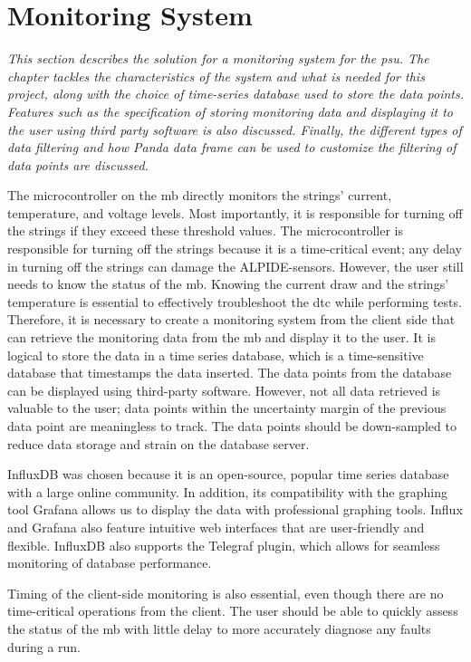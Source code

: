 \documentclass[main.tex]{subfiles}
\begin{document}
\section{Monitoring System}
\label{section: monitoring}
\textit{This section describes the solution for a monitoring system for the \gls{psu}. The chapter tackles the characteristics of the system and what is needed for this project, along with the choice of time-series database used to store the data points. Features such as the specification of storing monitoring data and displaying it to the user using third party software is also discussed. Finally, the different types of data filtering and how Panda data frame can be used to customize the filtering of data points are discussed.}


The microcontroller on the \gls{mb} directly monitors the strings' current, temperature, and voltage levels. Most importantly, it is responsible for turning off the strings if they exceed these threshold values. The microcontroller is responsible for turning off the strings because it is a time-critical event; any delay in turning off the strings can damage the ALPIDE-sensors. However, the user still needs to know the status of the \gls{mb}. Knowing the current draw and the strings' temperature is essential to effectively troubleshoot the \gls{dtc} while performing tests. Therefore, it is necessary to create a monitoring system from the client side that can retrieve the monitoring data from the \gls{mb} and display it to the user. It is logical to store the data in a time series database, which is a time-sensitive database that timestamps the data inserted. The data points from the database can be displayed using third-party software. However, not all data retrieved is valuable to the user; data points within the uncertainty margin of the previous data point are meaningless to track. The data points should be down-sampled to reduce data storage and strain on the database server.
 
InfluxDB was chosen because it is an open-source, popular time series database with a large online community. In addition, its compatibility with the graphing tool Grafana allows us to display the data with professional graphing tools. Influx and Grafana also feature intuitive web interfaces that are user-friendly and flexible. InfluxDB also supports the Telegraf plugin, which allows for seamless monitoring of database performance. 
 
 Timing of the client-side monitoring is also essential, even though there are no time-critical operations from the client. The user should be able to quickly assess the status of the \gls{mb} with little delay to more accurately diagnose any faults during a run.
 
\end{document}
